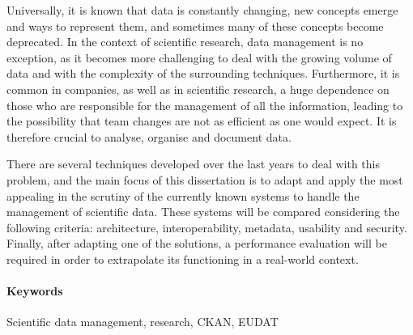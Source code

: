 Universally, it is known that data is constantly changing, new concepts emerge and ways to represent them, and sometimes many of these concepts become deprecated. In the context of scientific research, data management is no exception, as it becomes more challenging to deal with the growing volume of data and with the complexity of the surrounding techniques. Furthermore, it is common in companies, as well as in scientific research, a huge dependence on those who are responsible for the management of all the information, leading to the possibility that team changes are not as efficient as one would expect. It is therefore crucial to analyse, organise and document data.
    
There are several techniques developed over the last years to deal with this problem, and the main focus of this dissertation is to adapt and apply the most appealing in the scrutiny of the currently known systems to handle the management of scientific data. These systems will be compared considering the following criteria: architecture, interoperability, metadata, usability and security. Finally, after adapting one of the solutions, a performance evaluation will be required in order to extrapolate its functioning in a real-world context.

\paragraph{Keywords} Scientific data management, research, CKAN, EUDAT